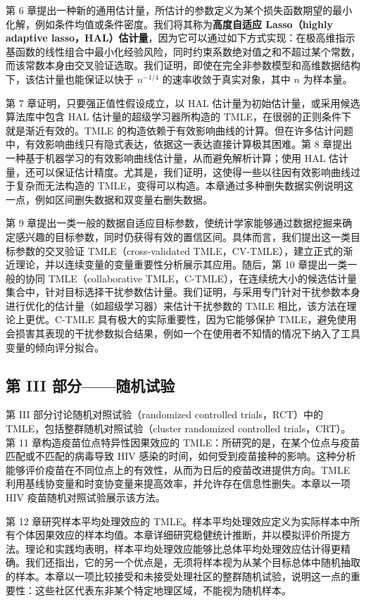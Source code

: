 第 6 章提出一种新的通用估计量，所估计的参数定义为某个损失函数期望的最小化解，例如条件均值或条件密度。我们将其称为\textbf{高度自适应 Lasso（highly adaptive lasso，HAL）估计量}，因为它可以通过如下方式实现：在极高维指示基函数的线性组合中最小化经验风险，同时约束系数绝对值之和不超过某个常数，而该常数本身由交叉验证选取。我们证明，即使在完全非参数模型和高维数据结构下，该估计量也能保证以快于 $n^{-1/4}$ 的速率收敛于真实对象，其中 $n$ 为样本量。

第 7 章证明，只要强正值性假设成立，以 HAL 估计量为初始估计量，或采用候选算法库中包含 HAL 估计量的超级学习器所构造的 TMLE，在很弱的正则条件下就是渐近有效的。TMLE 的构造依赖于有效影响曲线的计算。但在许多估计问题中，有效影响曲线只有隐式表达，依据这一表达直接计算极其困难。第 8 章提出一种基于机器学习的有效影响曲线估计量，从而避免解析计算；使用 HAL 估计量，还可以保证估计精度。尤其是，我们证明，这使得一些以往因有效影响曲线过于复杂而无法构造的 TMLE，变得可以构造。本章通过多种删失数据实例说明这一点，例如区间删失数据和双变量右删失数据。

第 9 章提出一类一般的数据自适应目标参数，使统计学家能够通过数据挖掘来确定感兴趣的目标参数，同时仍获得有效的置信区间。具体而言，我们提出这一类目标参数的交叉验证 TMLE（cross-validated TMLE，CV-TMLE），建立正式的渐近理论，并以连续变量的变量重要性分析展示其应用。随后，第 10 章提出一类一般的协同 TMLE（collaborative TMLE，C-TMLE），在连续统大小的候选估计量集合中，针对目标选择干扰参数估计量。我们证明，与采用专门针对干扰参数本身进行优化的估计量（如超级学习器）来估计干扰参数的 TMLE 相比，该方法在理论上更优。C-TMLE 具有极大的实际重要性，因为它能够保护 TMLE，避免使用会损害其表现的干扰参数拟合结果，例如一个在使用者不知情的情况下纳入了工具变量的倾向评分拟合。

\subsection*{第 III 部分——随机试验}

第 III 部分讨论随机对照试验（randomized controlled trials，RCT）中的 TMLE，包括整群随机对照试验（cluster randomized controlled trials，CRT）。第 11 章构造疫苗位点特异性因果效应的 TMLE：所研究的是，在某个位点与疫苗匹配或不匹配的病毒导致 HIV 感染的时间，如何受到疫苗接种的影响。这种分析能够评价疫苗在不同位点上的有效性，从而为日后的疫苗改进提供方向。TMLE 利用基线协变量和时变协变量来提高效率，并允许存在信息性删失。本章以一项 HIV 疫苗随机对照试验展示该方法。

第 12 章研究样本平均处理效应的 TMLE。样本平均处理效应定义为实际样本中所有个体因果效应的样本均值。本章详细研究稳健统计推断，并以模拟评价所提方法。理论和实践均表明，样本平均处理效应能够比总体平均处理效应估计得更精确。我们还指出，它的另一个优点是，无须将样本视为从某个目标总体中随机抽取的样本。本章以一项比较接受和未接受处理社区的整群随机试验，说明这一点的重要性：这些社区代表东非某个特定地理区域，不能视为随机样本。

